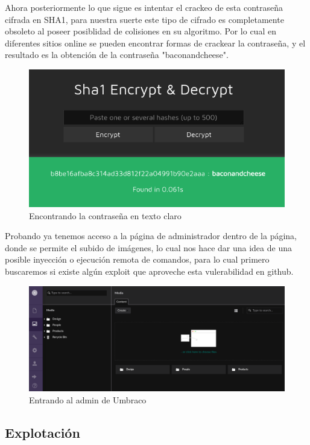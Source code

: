 \documentclass{article}
\begin{document}
Ahora posteriormente lo que sigue es intentar el crackeo de esta contraseña cifrada en SHA1, para nuestra suerte este tipo de cifrado es completamente obsoleto al poseer posiblidad de colisiones en su algoritmo.
Por lo cual en diferentes sitios online se pueden encontrar formas de crackear la contraseña, y el resultado es la obtención de la contraseña "baconandcheese".
\begin{figure}[h!]
	\center 
	\includegraphics[width=\textwidth]{images/remote/sha1.png}
	\caption{Encontrando la contraseña en texto claro}
\end{figure}

\clearpage

Probando ya tenemos acceso a la página de administrador dentro de la página, donde se permite el subido de imágenes, lo cual nos hace dar una idea de una posible inyección o ejecución remota de comandos, para lo cual primero buscaremos si existe algún exploit que aproveche esta vulerabilidad en github.
\begin{figure}[h]
	\center 
	\includegraphics[width=\textwidth]{images/remote/admin-panel.png}
	\caption{Entrando al admin de Umbraco}
\end{figure}


\subsection{Explotación}
\end{document}
